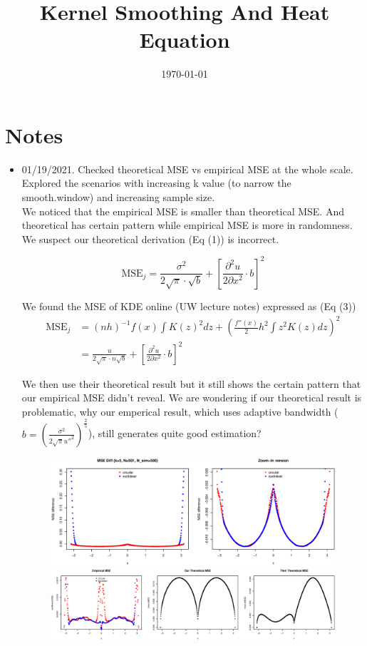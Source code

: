 \documentclass{article}
\title{Kernel Smoothing And Heat Equation}
\date{\today}
\begin{document}
\maketitle

\section{Notes}
\label{sec:notes}

\begin{itemize}
\item 01/19/2021. Checked theoretical MSE vs empirical MSE at the whole scale. Explored the scenarios with increasing k value (to narrow the smooth.window) and increasing sample size.\\
We noticed that the empirical MSE is smaller than theoretical MSE. And theoretical has certain pattern while empirical MSE is more in randomness. We suspect our theoretical derivation (Eq (1)) is incorrect. 

\begin{equation}
         \text{MSE}_j=  \frac{\sigma^2}{2\sqrt{\pi} \cdot \sqrt{b}}  + \left[\frac{\partial^2 u}{2\partial x^2}\cdot b \right]^2
\end{equation}

We found the MSE of KDE online (UW lecture notes) expressed as (Eq (3))
\begin{align}
         \text{MSE}_j &= (nh)^{-1}f(x)\int K(z)^2 dz + \left(\frac{f''(x)}{2} h^2 \int z^2K(z)dz \right)^2 \\
         &= \frac{u}{2\sqrt{\pi} \cdot n\sqrt{b}}  + \left[\frac{\partial^2 u}{2\partial x^2}\cdot b \right]^2
\end{align}

We then use their theoretical result but it still shows the certain pattern that our empirical MSE didn't reveal. We are wondering if our theoretical result is problematic, why our emperical result, which uses adaptive bandwidth ($b =\left(\frac{\sigma^2}{2\sqrt{\pi} u''^2}\right)^{\frac{2}{5}} $), still generates quite good estimation?


\begin{figure}[H]
\includegraphics[width=\linewidth]{pic/sim.diff1.eps}
\includegraphics[width=\linewidth]{pic/sim.diff2.eps}
\end{figure}


\end{itemize}
\end{document}
